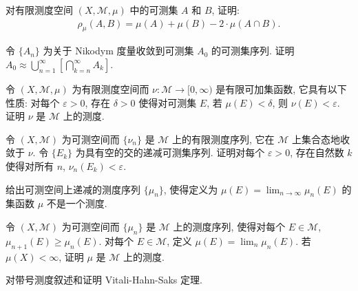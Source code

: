\documentclass[../../main.tex]{subfiles}
\begin{document}
\begin{exercise}\label{exercise:ch18-34}
对有限测度空间 $(X,\mathcal{M},\mu)$ 中的可测集 $A$ 和 $B$, 证明:
\begin{align*}
\rho_{\mu}(A,B)=\mu(A)+\mu(B)-2\cdot\mu(A\cap B).
\end{align*}
\end{exercise}

\begin{exercise}\label{exercise:ch18-35}
令 $\{A_{n}\}$ 为关于 Nikodym 度量收敛到可测集 $A_{0}$ 的可测集序列. 证明 $A_{0}\approx\bigcup_{n=1}^{\infty}\left[\bigcap_{k=n}^{\infty}A_{k}\right]$.
\end{exercise}

\begin{exercise}\label{exercise:ch18-36}
令 $(X,\mathcal{M},\mu)$ 为有限测度空间而 $\nu:\mathcal{M}\to[0,\infty)$ 是有限可加集函数, 它具有以下性质: 对每个 $\varepsilon>0$, 存在 $\delta>0$ 使得对可测集 $E$, 若 $\mu(E)<\delta$, 则 $\nu(E)<\varepsilon$. 证明 $\nu$ 是 $\mathcal{M}$ 上的测度.
\end{exercise}

\begin{exercise}\label{exercise:ch18-37}
令 $(X,\mathcal{M})$ 为可测空间而 $\{\nu_{n}\}$ 是 $\mathcal{M}$ 上的有限测度序列, 它在 $\mathcal{M}$ 上集合态地收敛于 $\nu$. 令 $\{E_{k}\}$ 为具有空的交的递减可测集序列. 证明对每个 $\varepsilon>0$, 存在自然数 $k$ 使得对所有 $n$, $\nu_{n}(E_{k})<\varepsilon$.
\end{exercise}

\begin{exercise}\label{exercise:ch18-38}
给出可测空间上递减的测度序列 $\{\mu_{n}\}$, 使得定义为 $\mu(E)=\lim_{n\to\infty}\mu_{n}(E)$ 的集函数 $\mu$ 不是一个测度.
\end{exercise}

\begin{exercise}\label{exercise:ch18-39}
令 $(X,\mathcal{M})$ 为可测空间而 $\{\mu_{n}\}$ 是 $\mathcal{M}$ 上的测度序列, 使得对每个 $E\in\mathcal{M}$, $\mu_{n+1}(E)\geqslant\mu_{n}(E)$. 对每个 $E\in\mathcal{M}$, 定义 $\mu(E)=\lim_{n}\mu_{n}(E)$. 若 $\mu(X)<\infty$, 证明 $\mu$ 是 $\mathcal{M}$ 上的测度.
\end{exercise}

\begin{exercise}\label{exercise:ch18-40}
对带号测度叙述和证明 Vitali-Hahn-Saks 定理.
\end{exercise}
\end{document}
